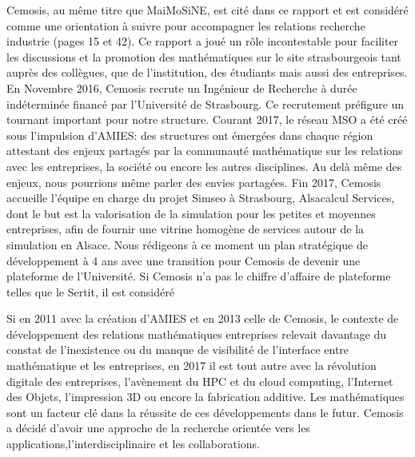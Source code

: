 Cemosis, au même titre que MaiMoSiNE, est cité dans ce rapport et est considéré comme une orientation à suivre pour accompagner les relations recherche industrie (pages 15 et 42). 
Ce rapport a joué un rôle incontestable pour faciliter les discussions et la promotion des mathématiques sur le site strasbourgeois tant auprès des collègues, que de l'institution, des étudiants mais aussi des entreprises.
En Novembre 2016, Cemosis recrute un Ingénieur de Recherche à durée indéterminée financé par l'Université de Strasbourg. Ce recrutement préfigure un tournant important pour notre structure.
Courant 2017, le réseau MSO a été créé sous l'impulsion d'AMIES: des structures ont émergées dans chaque région attestant des enjeux partagés par la communauté mathématique sur les relations avec les entreprises, la société ou encore les autres disciplines. 
Au delà même des enjeux, nous pourrions même parler des envies partagées.
Fin 2017, Cemosis accueille l'équipe en charge du projet Simseo à Strasbourg, Alsacalcul Services, dont le but est la valorisation de la simulation pour les petites et moyennes entreprises, afin de fournir une vitrine homogène de services autour de la simulation en Alsace.
Nous rédigeons à ce moment un plan stratégique de développement à 4 ans avec une transition pour Cemosis de devenir une plateforme de l'Université. Si Cemosis n'a pas le chiffre d'affaire de plateforme telles que le Sertit, il est considéré

Si en 2011 avec la création d'AMIES et en 2013 celle de Cemosis, le contexte de développement des relations mathématiques entreprises relevait davantage du constat de l'inexistence ou du manque de visibilité de l'interface entre mathématique et les entreprises, en 2017 il est tout autre avec la révolution digitale des entreprises, l'avènement du HPC et du cloud computing, l'Internet des Objets, l'impression 3D ou encore la fabrication additive. Les mathématiques sont un facteur clé dans la réussite de ces développements dans le futur. Cemosis a décidé d'avoir une approche de la recherche orientée vers les applications,l'interdisciplinaire et les collaborations.
 
 

\vspace{1cm}